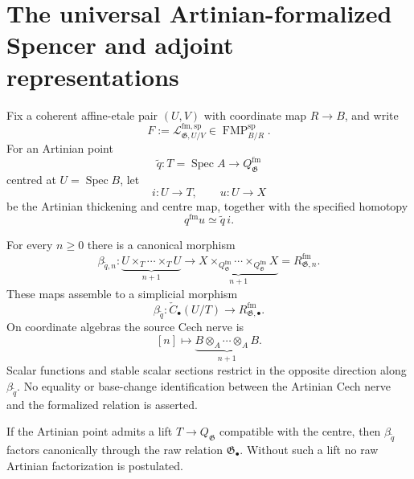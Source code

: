 \section{The universal Artinian-formalized Spencer and adjoint representations}
\label{sec:as-universal-spencer-representation}

Fix a coherent affine-etale pair $(U,V)$ with coordinate map $R\to B$, and
write
\[
    F
    :=
    \mathcal L_{\mathfrak G,U/V}^{\mathrm{fm,sp}}
    \in
    \operatorname{FMP}^{\mathrm{sp}}_{B/R}.
\]
For an Artinian point
\[
    \widetilde q:
    T=\operatorname{Spec}A\longrightarrow Q_{\mathfrak G}^{\mathrm{fm}}
\]
centred at $U=\operatorname{Spec}B$, let
\[
    i:U\longrightarrow T,
    \qquad
    u:U\longrightarrow X
\]
be the Artinian thickening and centre map, together with the specified
homotopy
\[
    q^{\mathrm{fm}}u\simeq\widetilde q\,i.
\]

\begin{proposition}
\label{prop:as-artinian-cech-test-map}
For every $n\geq0$ there is a canonical morphism
\[
\boxed{
    \beta_{\widetilde q,n}:
    \underbrace{U\times_T\cdots\times_TU}_{n+1}
    \longrightarrow
    \underbrace{
    X\times_{Q_{\mathfrak G}^{\mathrm{fm}}}\cdots
    \times_{Q_{\mathfrak G}^{\mathrm{fm}}}X
    }_{n+1}
    =R_{\mathfrak G,n}^{\mathrm{fm}}.
}
\]
These maps assemble to a simplicial morphism
\[
\boxed{
    \beta_{\widetilde q}:
    \check C_\bullet(U/T)
    \longrightarrow
    R_{\mathfrak G,\bullet}^{\mathrm{fm}}.
}
\]
On coordinate algebras the source Cech nerve is
\[
    [n]\longmapsto
    \underbrace{B\otimes_A\cdots\otimes_A B}_{n+1}.
\]
Scalar functions and stable scalar sections restrict in the opposite
direction along $\beta_{\widetilde q}$.  No equality or base-change
identification between the Artinian Cech nerve and the formalized relation is
asserted.

If the Artinian point admits a lift
$T\to Q_{\mathfrak G}$ compatible with the centre, then
$\beta_{\widetilde q}$ factors canonically through the raw relation
$\mathfrak G_\bullet$.  Without such a lift no raw Artinian factorization is
postulated.
\end{proposition}

